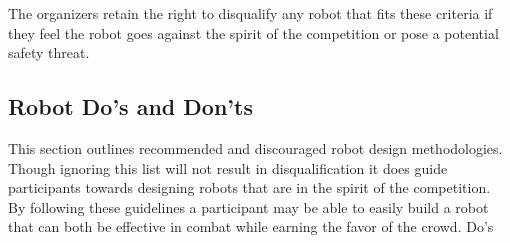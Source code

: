 \documentclass{article}
\begin{document}
		The organizers retain the right to disqualify any robot that fits these criteria if they feel the robot goes against the spirit of the competition or pose a potential safety threat.
				
				
	\subsection {Robot Do's and Don'ts}	
			
		This section outlines recommended and discouraged robot design methodologies. Though ignoring this list will not result in disqualification it does guide participants towards designing robots that are in the spirit of the competition. By following these guidelines a participant may be able to easily build a robot that can both be effective in combat while earning the favor of the crowd.
Do's
		
\end{document}
